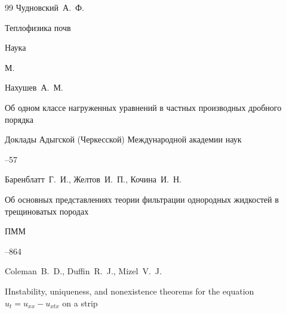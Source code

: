 \begin{thebibliography}{99}
\by Чудновский~А.~Ф.

\book Теплофизика почв


\publ Наука

\publaddr М.









\by Нахушев~А.~М. 

\paper Об одном классе нагруженных уравнений в частных производных дробного порядка

\jour Доклады Адыгской (Черкесской) Международной академии наук




--57







\by Баренблатт~Г.~И., Желтов~И.~П., Кочина~И.~Н.

\paper Об основных представлениях теории фильтрации однородных жидкостей в трещиноватых породах

\jour ПММ 




–864
















\by  Coleman~B.~D., Duffin~R.~J., Mizel~V.~J.

\paper IInstability, uniqueness, and nonexistence theorems for the equation $u_t=u_{xx}-u_{xtx}$ on a strip


\end{thebibliography}
